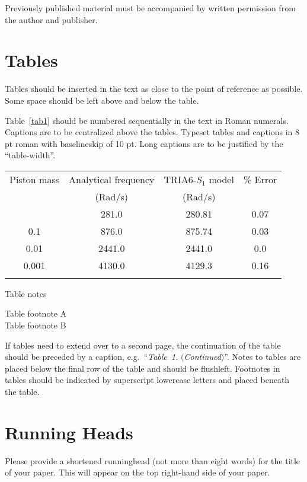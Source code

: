 \documentclass{IJCS_template}
\begin{document}
Previously published material must be accompanied by written
permission from the author and publisher.

\section{Tables}
Tables should be inserted in the text as close to the point of
reference as possible. Some space should be left above and below
the table.

Table~\ref{tab1} should be numbered sequentially in the text in
Roman numerals. Captions are to be centralized above the tables.
Typeset tables and captions in 8 pt roman with baselineskip of 10
pt. Long captions are to be justified by the ``table-width''.

\begin{table}[th]
{\begin{tabular}{@{}cccc@{}} \toprule
Piston mass & Analytical frequency & TRIA6-$S_1$ model &
\% Error \\
& (Rad/s) & (Rad/s) \\ \colrule
1.0\hphantom{00} & \hphantom{0}281.0 & \hphantom{0}280.81 & 0.07 \\
0.1\hphantom{00} & \hphantom{0}876.0 & \hphantom{0}875.74 & 0.03 \\
0.01\hphantom{0} & 2441.0 & 2441.0\hphantom{0} & 0.0\hphantom{0} \\
0.001 & 4130.0 & 4129.3\hphantom{0} & 0.16\\ \botrule
\end{tabular} }
\begin{tabnote}
Table notes
\end{tabnote}
\begin{tabfootnote}
 Table footnote A\\
 Table footnote B
\end{tabfootnote}
\end{table}

If tables need to extend over to a second page, the continuation of
the table should be preceded by a caption, e.g.~``{\it Table~1.}
$(${\it Continued}$)$''. Notes to tables are placed below the final
row of the table and should be flushleft.  Footnotes in tables
should be indicated by superscript lowercase letters and placed beneath
the table.

\section{Running Heads}
Please provide a shortened runninghead (not more than eight words) for
the title of your paper. This will appear on the top right-hand side
of your paper.
\end{document}
